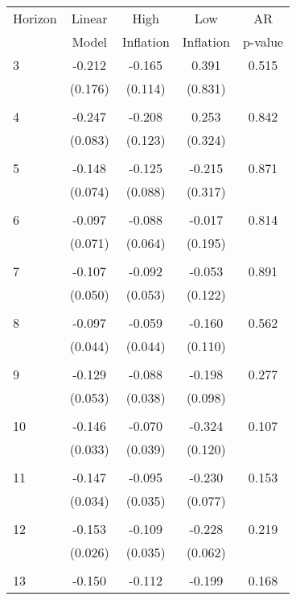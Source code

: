 \begin{tabular}{l*{1}{cccc}}
\hline\hline
 Horizon  & Linear & High                 & Low           & AR            \\
                  & Model         & Inflation & Inflation & p-value       \\
\hline
   3       & -0.212 & -0.165 & 0.391 & 0.515 \\
          & (0.176) & (0.114) & (0.831) & \\
 & & & &\\
   4       & -0.247 & -0.208 & 0.253 & 0.842 \\
          & (0.083) & (0.123) & (0.324) & \\
 & & & &\\
   5       & -0.148 & -0.125 & -0.215 & 0.871 \\
          & (0.074) & (0.088) & (0.317) & \\
 & & & &\\
   6       & -0.097 & -0.088 & -0.017 & 0.814 \\
          & (0.071) & (0.064) & (0.195) & \\
 & & & &\\
   7       & -0.107 & -0.092 & -0.053 & 0.891 \\
          & (0.050) & (0.053) & (0.122) & \\
 & & & &\\
   8       & -0.097 & -0.059 & -0.160 & 0.562 \\
          & (0.044) & (0.044) & (0.110) & \\
 & & & &\\
   9       & -0.129 & -0.088 & -0.198 & 0.277 \\
          & (0.053) & (0.038) & (0.098) & \\
 & & & &\\
  10       & -0.146 & -0.070 & -0.324 & 0.107 \\
          & (0.033) & (0.039) & (0.120) & \\
 & & & &\\
  11       & -0.147 & -0.095 & -0.230 & 0.153 \\
          & (0.034) & (0.035) & (0.077) & \\
 & & & &\\
  12       & -0.153 & -0.109 & -0.228 & 0.219 \\
          & (0.026) & (0.035) & (0.062) & \\
 & & & &\\
  13       & -0.150 & -0.112 & -0.199 & 0.168 \\

\end{tabular}
